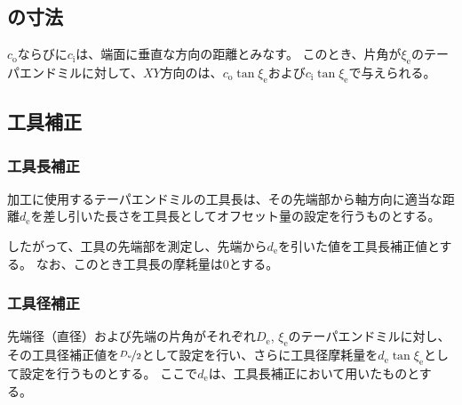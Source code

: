 \subsection{\EndFaceChamfer の寸法}
\EndFaceOutChamferLength$c_\mathrm o$ならびに\EndFaceInChamferLength$c_\mathrm i$は、端面に垂直な方向の距離とみなす。
このとき、片角が$\xi_\mathrm e$のテーパエンドミルに対して、$XY$方向の\EndFaceChamferLength は、$c_\mathrm o\tan\xi_\mathrm e$および$c_\mathrm i\tan\xi_\mathrm e$で与えられる。


\subsection{工具補正}

\subsubsection{工具長補正}
\nameEndFaceChamferLength 加工に使用するテーパエンドミルの工具長は、その先端部から軸方向に適当な距離$d_\mathrm e$を差し引いた長さを工具長としてオフセット量の設定を行うものとする。

したがって、工具の先端部を測定し、先端から$d_\mathrm e$を引いた値を工具長補正値とする。
なお、このとき工具長の摩耗量は0とする。

\subsubsection{工具径補正}
先端径（直径）および先端の片角がそれぞれ$D_\mathrm e$, $\xi_\mathrm e$のテーパエンドミルに対し、その工具径補正値を$\nicefrac{D_\mathrm e}2$として設定を行い、さらに工具径摩耗量を$d_\mathrm e\tan\xi_\mathrm e$として設定を行うものとする。
ここで$d_\mathrm e$は、工具長補正において用いたものとする。


